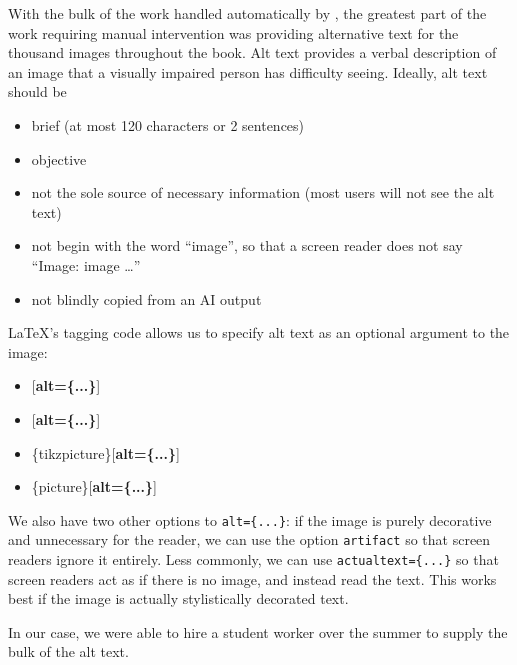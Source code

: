 \documentclass{ltugboat}
\begin{document}
With the bulk of the work handled automatically by \LuaLaTeX,
the greatest part of the work requiring manual intervention was
providing alternative text for the thousand images throughout the book.
Alt text provides a verbal description of an image
that a visually impaired person has difficulty seeing.
Ideally, alt text should be
\begin{itemize}
\item brief (at most 120 characters or 2 sentences)
\item objective
\item not the sole source of necessary information
(most users will not see the alt text)
\item not begin with the word ``image'',
so that a screen reader does not say ``Image: image \dots''
\item not blindly copied from an AI output
\end{itemize}
\LaTeX's tagging code allows us to specify alt text as an optional argument
to the image:
\begin{itemize}
\ttfamily
\item{}[\textbf{alt=\{...\}}]
\item{}[\textbf{alt=\{...\}}]
\item{}\{tikzpicture\}[\textbf{alt=\{...\}}]
\item{}\{picture\}[\textbf{alt=\{...\}}]
\end{itemize}
We also have two other options to \texttt{alt=\{...\}}:
if the image is purely decorative and unnecessary for the reader,
we can use the option \texttt{artifact}
so that screen readers ignore it entirely.
Less commonly, we can use \texttt{actualtext=\{...\}}
so that screen readers act as if there is no image, and instead read the text.
This works best if the image is actually stylistically decorated text.

In our case, we were able to hire a student worker over the summer
to supply the bulk of the alt text.
\end{document}
